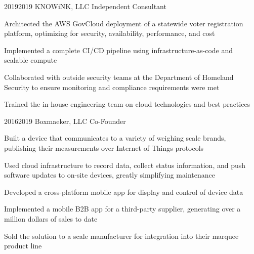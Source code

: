 \job
  {2019}{2019}
  {KNOWiNK, LLC}
  {Independent Consultant}
  {\begin{achievements}
    \item Architected the AWS GovCloud deployment of a statewide voter registration platform, optimizing for security, availability, performance, and cost
    \item Implemented a complete CI/CD pipeline using infrastructure-as-code and scalable compute
    \item Collaborated with outside security teams at the Department of Homeland Security to ensure monitoring and compliance requirements were met
    \item Trained the in-house engineering team on cloud technologies and best practices
  \end{achievements}}

\job
  {2016}{2019}
  {Boxmaeker, LLC}
  {Co-Founder}
  {\begin{achievements}
    \item Built a device that communicates to a variety of weighing scale brands, publishing their measurements over Internet of Things protocols
    \item Used cloud infrastructure to record data, collect status information, and push software updates to on-site devices, greatly simplifying maintenance
    \item Developed a cross-platform mobile app for display and control of device data
    \item Implemented a mobile B2B app for a third-party supplier, generating over a million dollars of sales to date
    \item Sold the solution to a scale manufacturer for integration into their marquee product line
  \end{achievements}}
